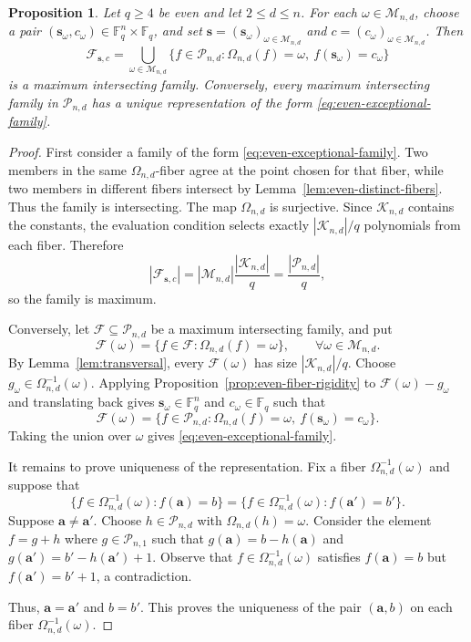 \documentclass[12pt,reqno]{amsart}
\newtheorem{prop}[thm]{Proposition}
\theoremstyle{definition}
\newcommand{\F}{\mathbb{F}}
\newcommand{\cF}{\mathcal F}
\newcommand{\cP}{\mathcal P}
\newcommand{\cM}{\mathcal M}
\begin{document}
\begin{prop}
\label{prop:even-exceptional-classification}
Let $q\geq4$ be even and let $2\leq d\leq n$. For each
$\omega\in\cM_{n,d}$, choose a pair $(\mathbf s_\omega,c_\omega)\in \F_q^n\times \F_q$, and set $\mathbf{s}=(\mathbf{s}_{\omega})_{\omega\in \cM_{n,d}}$ and $c=(c_{\omega})_{\omega\in \cM_{n,d}}$. Then
\begin{equation}\label{eq:even-exceptional-family}
  \cF_{\mathbf s,c}
  =\bigcup_{\omega\in\cM_{n,d}}
    \{f\in\cP_{n,d}:\Omega_{n,d}(f)=\omega,
       \ f(\mathbf s_\omega)=c_\omega\}
\end{equation}
is a maximum intersecting family. Conversely, every maximum
intersecting family in $\cP_{n,d}$ has a unique representation of the
form \eqref{eq:even-exceptional-family}.
\end{prop}

\begin{proof}
First consider a family of the form
\eqref{eq:even-exceptional-family}. Two members in the same
$\Omega_{n,d}$-fiber agree at the point chosen for that fiber, while two
members in different fibers intersect by
Lemma~\ref{lem:even-distinct-fibers}. Thus the family is intersecting.
The map $\Omega_{n,d}$ is surjective. Since $\mathcal K_{n,d}$ contains
the constants, the evaluation condition selects exactly
$|\mathcal K_{n,d}|/q$ polynomials from each fiber. Therefore
\[
  |\cF_{\mathbf s,c}|
  =|\cM_{n,d}|\frac{|\mathcal K_{n,d}|}{q}
  =\frac{|\cP_{n,d}|}{q},
\]
so the family is maximum.

Conversely, let $\cF\subseteq\cP_{n,d}$ be a maximum intersecting family, and
put
\[
  \cF(\omega)=\{f\in\cF:\Omega_{n,d}(f)=\omega\},  \qquad \forall \omega\in\cM_{n,d}.
\]
By Lemma~\ref{lem:transversal},
every $\cF(\omega)$ has size
$|\mathcal K_{n,d}|/q$. Choose
$g_\omega\in\Omega_{n,d}^{-1}(\omega)$. Applying
Proposition~\ref{prop:even-fiber-rigidity} to
$\cF(\omega)-g_\omega$ and translating back gives
$\mathbf s_\omega\in \F_q^n$ and $c_\omega\in \F_q$ such that
\[
  \cF(\omega)
  =\{f\in\cP_{n,d}:\Omega_{n,d}(f)=\omega,
       \ f(\mathbf s_\omega)=c_\omega\}.
\]
Taking the union over $\omega$ gives
\eqref{eq:even-exceptional-family}.

It remains to prove uniqueness of the representation. Fix a fiber $\Omega_{n,d}^{-1}(\omega)$ and suppose that
\[
  \{f\in \Omega_{n,d}^{-1}(\omega):f(\mathbf{a})=b\}
  =\{f\in \Omega_{n,d}^{-1}(\omega):f(\mathbf{a}')=b'\}.
\]
Suppose $\mathbf{a}\neq \mathbf{a}'$. Choose $h\in\cP_{n,d}$ with $\Omega_{n,d}(h)=\omega$. Consider the element $f=g+h$ where $g\in\cP_{n,1}$ such that $g(\mathbf{a})=b-h(\mathbf{a})$ and $g(\mathbf{a}') = b'-h(\mathbf{a}')+1$. Observe that $f\in \Omega_{n,d}^{-1}(\omega)$ satisfies $f(\mathbf{a})=b$ but $f(\mathbf{a}')=b'+1$, a contradiction. 

Thus, $\mathbf{a}=\mathbf{a}'$ and $b=b'$. This proves the uniqueness of the
pair $(\mathbf{a},b)$ on each fiber $\Omega_{n,d}^{-1}(\omega)$.
\end{proof}
\end{document}
